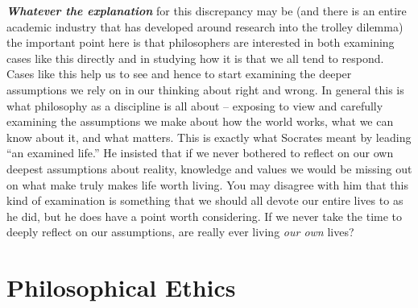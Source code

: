 \documentclass[12pt, openany]{book}
\begin{document}
\textbf{\emph{Whatever the explanation}} for this discrepancy may be (and there is an entire academic industry that has developed around research into the trolley dilemma) the important point here is that philosophers are interested in both examining cases like this directly and in studying how it is that we all tend to respond. Cases like this help us to see and hence to start examining the deeper assumptions we rely on in our thinking about right and wrong. In general this is what philosophy as a discipline is all about -- exposing to view and carefully examining the assumptions we make about how the world works, what we can know about it, and what matters. This is exactly what Socrates meant by leading ``an examined life.'' He insisted that if we never bothered to reflect on our own deepest assumptions about reality, knowledge and values we would be missing out on what make truly makes life worth living. You may disagree with him that this kind of examination is something that we should all devote our entire lives to as he did, but he does have a point worth considering. If we never take the time to deeply reflect on our assumptions, are really ever living \emph{our own} lives?

\hypertarget{philosophical-ethics}{%
\section{Philosophical Ethics}\label{philosophical-ethics}}
\end{document}
